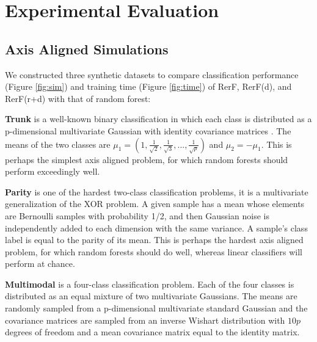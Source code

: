 \documentclass{article} %
\begin{document}

\section{Experimental Evaluation}

\subsection{Axis Aligned Simulations}

We constructed three synthetic datasets to compare classification performance (Figure \ref{fig:sim}) and training time (Figure \ref{fig:time}) of RerF, RerF(d), and RerF(r+d) with that of random forest:

\textbf{Trunk} is a well-known binary classification in which each class is distributed as a p-dimensional multivariate Gaussian with identity covariance matrices \cite{Trunk1979}. The means of the two classes are $\mu_1 = (1,\frac{1}{\sqrt{2}},\frac{1}{\sqrt{3}},...,\frac{1}{\sqrt{p}})$ and $\mu_2 = -\mu_1$. This is perhaps the simplest axis aligned problem, for which random forests should perform exceedingly well.  

\textbf{Parity} is one of the hardest two-class classification problems, it is a multivariate generalization of the XOR problem.  A given sample has a mean whose elements are Bernoulli samples with probability 1/2, and then Gaussian noise is independently added to each dimension with the same variance.  A sample's class label is equal to the parity of its mean.  This is perhaps the hardest axis aligned problem, for which random forests should do well, whereas linear classifiers will perform at chance.

\textbf{Multimodal} is a four-class classification problem. Each of the four classes is distributed as an equal mixture of two multivariate Gaussians. The means are randomly sampled from a p-dimensional multivariate standard Gaussian and the covariance matrices are sampled from an inverse Wishart distribution with $10p$ degrees of freedom and  a mean covariance matrix equal to the identity matrix.
\end{document}
